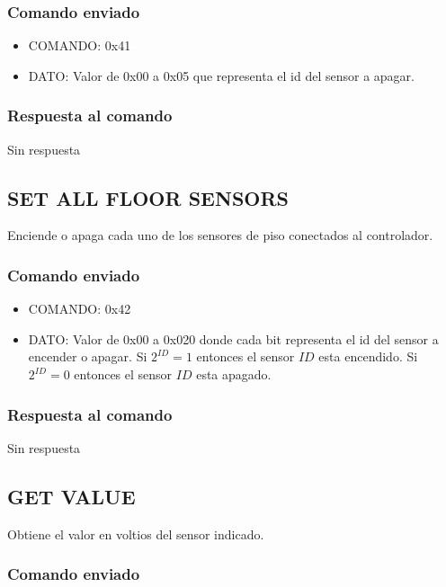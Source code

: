 \documentclass[a4paper,10pt]{article}
\begin{document}
\subsubsection*{Comando enviado}

\begin{itemize}
	\item{COMANDO:} 0x41
	\item{DATO:} Valor de 0x00 a 0x05 que representa el id del sensor a apagar.
\end{itemize}

\subsubsection*{Respuesta al comando}

Sin respuesta

\subsection{SET ALL FLOOR SENSORS}
\label{set_all_fs}

Enciende o apaga cada uno de los sensores de piso conectados al controlador.

\subsubsection*{Comando enviado}

\begin{itemize}
	\item{COMANDO:} 0x42
	\item{DATO:} Valor de 0x00 a 0x020 donde cada bit representa el id del sensor a encender o apagar.
	Si $2^{ID} = 1$ entonces el sensor $ID$ esta encendido.
	Si $2^{ID} = 0$ entonces el sensor $ID$ esta apagado.
\end{itemize}

\subsubsection*{Respuesta al comando}

Sin respuesta

\subsection{GET VALUE}
\label{get_value_fs}

Obtiene el valor en voltios del sensor indicado.

\subsubsection*{Comando enviado}
\end{document}
